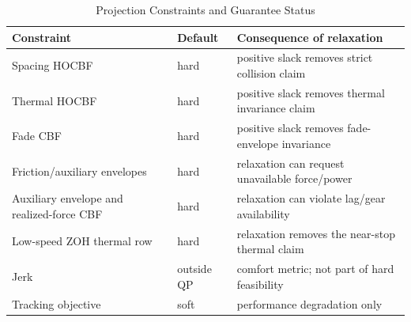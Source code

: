 \begin{table}[t]
\caption{Projection Constraints and Guarantee Status}
\label{tab:constraints}
\centering
\scriptsize
\begin{tabular}{@{}p{}p{}p{}@{}}
\toprule
Constraint & Default & Consequence of relaxation \\
\midrule
Spacing HOCBF & hard & positive slack removes strict collision claim \\
Thermal HOCBF & hard & positive slack removes thermal invariance claim \\
Fade CBF & hard & positive slack removes fade-envelope invariance \\
Friction/auxiliary envelopes & hard & relaxation can request unavailable force/power \\
Auxiliary envelope and realized-force CBF & hard & relaxation can violate lag/gear availability \\
Low-speed ZOH thermal row & hard & relaxation removes the near-stop thermal claim \\
Jerk & outside QP & comfort metric; not part of hard feasibility \\
Tracking objective & soft & performance degradation only \\
\bottomrule
\end{tabular}
\end{table}
